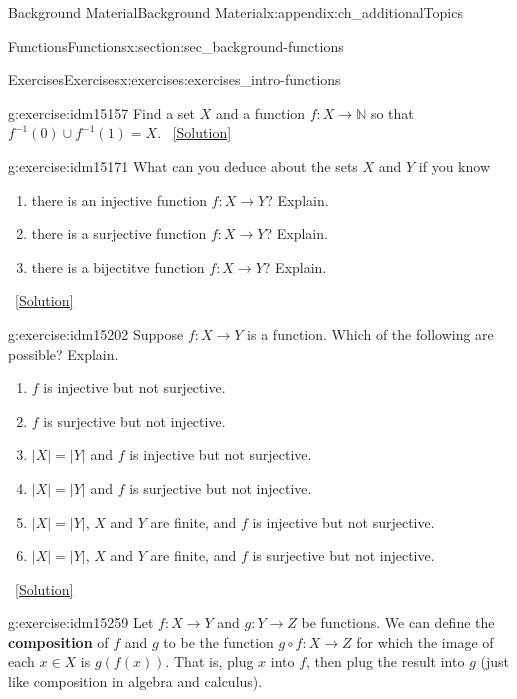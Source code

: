 \documentclass[oneside,10pt,]{book}
\newcommand{\terminology}[1]{\textbf{#1}}
\numberwithin{equation}{chapter}
\def\N{\mathbb N}
\def\inv{^{-1}}
\begin{document}
\begin{appendixptx}{Background Material}{}{Background Material}{}{}{x:appendix:ch_additionalTopics}
\begin{sectionptx}{Functions}{}{Functions}{}{}{x:section:sec_background-functions}
\begin{exercises-subsection}{Exercises}{}{Exercises}{}{}{x:exercises:exercises_intro-functions}
\begin{divisionexercise}{10}{}{}{g:exercise:idm15157}%
Find a set \(X\) and a function \(f:X \to \N\) so that \(f\inv(0) \cup f\inv(1) = X\).%
\qquad~\hfill{\tiny\hyperlink{g:solution:idm15163-main}{[Solution]}}\end{divisionexercise}%
\begin{divisionexercise}{11}{}{}{g:exercise:idm15171}%
What can you deduce about the sets \(X\) and \(Y\) if you know \textellipsis{}%
\begin{enumerate}[label=(\alph*)]
\item{}there is an injective function \(f:X \to Y\)? Explain.%
\item{}there is a surjective function \(f:X \to Y\)? Explain.%
\item{}there is a bijectitve function \(f:X \to Y\)? Explain.%
\end{enumerate}
%
\qquad~\hfill{\tiny\hyperlink{g:solution:idm15187-main}{[Solution]}}\end{divisionexercise}%
\begin{divisionexercise}{12}{}{}{g:exercise:idm15202}%
Suppose \(f:X \to Y\) is a function. Which of the following are possible? Explain.%
\begin{enumerate}[label=(\alph*)]
\item{}\(f\) is injective but not surjective.%
\item{}\(f\) is surjective but not injective.%
\item{}\(|X| = |Y|\) and \(f\) is injective but not surjective.%
\item{}\(|X| = |Y|\) and \(f\) is surjective but not injective.%
\item{}\(|X| = |Y|\), \(X\) and \(Y\) are finite, and \(f\) is injective but not surjective.%
\item{}\(|X| = |Y|\), \(X\) and \(Y\) are finite, and \(f\) is surjective but not injective.%
\end{enumerate}
%
\qquad~\hfill{\tiny\hyperlink{g:solution:idm15227-main}{[Solution]}}\end{divisionexercise}%
\begin{divisionexercise}{13}{}{}{g:exercise:idm15259}%
Let \(f:X \to Y\) and \(g:Y \to Z\) be functions.  We can define the \terminology{composition} of \(f\) and \(g\) to be the function \(g\circ f:X \to Z\) for which the image of each \(x \in X\) is \(g(f(x))\).  That is, plug \(x\) into \(f\), then plug the result into \(g\) (just like composition in algebra and calculus).%
\par

\end{divisionexercise}
\end{exercises-subsection}
\end{sectionptx}
\end{appendixptx}
\end{document}
